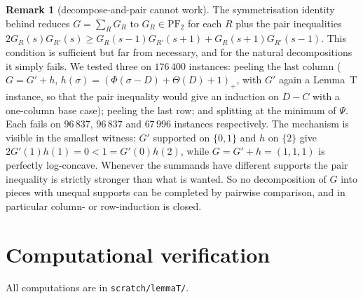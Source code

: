 \documentclass[11pt]{article}
\theoremstyle{definition}
\newtheorem{remark}[theorem]{Remark}
\newcommand{\PFtwo}{\mathrm{PF}_2}
\begin{document}
\begin{remark}[decompose-and-pair cannot work]\label{rem:pairs}
The symmetrisation identity behind \cite[\S5]{c1} reduces $G=\sum_R G_R$ to
$G_R\in\PFtwo$ for each $R$ plus the pair inequalities
$2G_R(s)G_{R'}(s)\ge G_R(s-1)G_{R'}(s+1)+G_R(s+1)G_{R'}(s-1)$. This condition is
sufficient but far from necessary, and for the natural decompositions it simply fails.
We tested three on $176\,400$ instances: peeling the last column
($G=G'+h$, $h(\sigma)=(\Phi(\sigma-D)+\Theta(D)+1)_+$, with $G'$ again a Lemma~T instance,
so that the pair inequality would give an induction on $D-C$ with a one-column base
case); peeling the last row; and splitting at the minimum of $\Psi$. Each fails on
$96\,837$, $96\,837$ and $67\,996$ instances respectively. The mechanism is visible in
the smallest witness: $G'$ supported on $\{0,1\}$ and $h$ on $\{2\}$ give
$2G'(1)h(1)=0<1=G'(0)h(2)$, while $G=G'+h=(1,1,1)$ is perfectly log-concave. Whenever the
summands have different supports the pair inequality is strictly stronger than what is
wanted. So no decomposition of $G$ into pieces with unequal supports can be completed by
pairwise comparison, and in particular column- or row-induction is closed.
\end{remark}

\section{Computational verification}

All computations are in \texttt{scratch/lemmaT/}.
\end{document}
